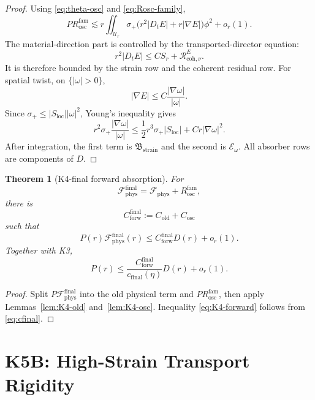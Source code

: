\documentclass[11pt]{article}
\newtheorem{theorem}{Theorem}
\begin{document}
\begin{proof}
Using \eqref{eq:theta-osc} and \eqref{eq:Rosc-family},
\[
P R_{\mathrm{osc}}^{\mathrm{fam}}
\lesssim
r\iint_{\mathcal U_r}\sigma_+
\big(r^2|D_tE|+r|\nabla E|\big)\phi^2+o_r(1).
\]
The material-direction part is controlled by the transported-director equation:
\[
r^2|D_tE|\le C S_r+\mathcal R_{\mathrm{coh},\nu}^{E}.
\]
It is therefore bounded by the strain row and the coherent residual row.  For
spatial twist, on \(\{|\omega|>0\}\),
\[
|\nabla E|\le C\frac{|\nabla\omega|}{|\omega|}.
\]
Since \(\sigma_+\le |S_{\mathrm{loc}}||\omega|^2\), Young's inequality gives
\[
r^2\sigma_+\frac{|\nabla\omega|}{|\omega|}
\le
\frac12 r^3\sigma_+|S_{\mathrm{loc}}|
+C r|\nabla\omega|^2.
\]
After integration, the first term is \(\mathfrak B_{\mathrm{strain}}\) and the
second is \(\mathcal E_\omega\).  All absorber rows are components of \(D\).
\end{proof}

\begin{theorem}[K4-final forward absorption]
\label{thm:K4}
For
\[
\mathcal F_{\mathrm{phys}}^{\mathrm{final}}
=\mathcal F_{\mathrm{phys}}+R_{\mathrm{osc}}^{\mathrm{fam}},
\]
there is
\begin{equation}
\label{eq:Cforw-final}
C_{\mathrm{forw}}^{\mathrm{final}}
:=C_{\mathrm{old}}+C_{\mathrm{osc}}
\end{equation}
such that
\begin{equation}
\label{eq:K4-final}
P(r)\mathcal F_{\mathrm{phys}}^{\mathrm{final}}(r)
\le
C_{\mathrm{forw}}^{\mathrm{final}}D(r)+o_r(1).
\end{equation}
Together with K3,
\begin{equation}
\label{eq:K4-forward}
P(r)
\le
\frac{C_{\mathrm{forw}}^{\mathrm{final}}}{c_{\mathrm{final}}(\eta)}D(r)
+o_r(1).
\end{equation}
\end{theorem}

\begin{proof}
Split \(P\mathcal F_{\mathrm{phys}}^{\mathrm{final}}\) into the old physical
term and \(P R_{\mathrm{osc}}^{\mathrm{fam}}\), then apply
Lemmas~\ref{lem:K4-old} and~\ref{lem:K4-osc}.  Inequality
\eqref{eq:K4-forward} follows from \eqref{eq:cfinal}.
\end{proof}

\clearpage
\section{K5B: High-Strain Transport Rigidity}
\label{sec:K5B}
\end{document}
